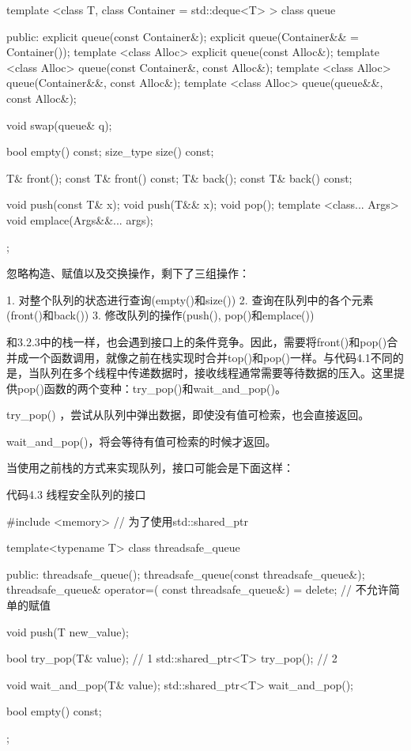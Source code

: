 \begin{cpp}
template <class T, class Container = std::deque<T> >
class queue {
public:
  explicit queue(const Container&);
  explicit queue(Container&& = Container());
  template <class Alloc> explicit queue(const Alloc&);
  template <class Alloc> queue(const Container&, const Alloc&);
  template <class Alloc> queue(Container&&, const Alloc&);
  template <class Alloc> queue(queue&&, const Alloc&);

  void swap(queue& q);

  bool empty() const;
  size_type size() const;

  T& front();
  const T& front() const;
  T& back();
  const T& back() const;

  void push(const T& x);
  void push(T&& x);
  void pop();
  template <class... Args> void emplace(Args&&... args);
};
\end{cpp}

忽略构造、赋值以及交换操作，剩下了三组操作：

1. 对整个队列的状态进行查询(empty()和size())
2. 查询在队列中的各个元素(front()和back())
3. 修改队列的操作(push(), pop()和emplace())

和3.2.3中的栈一样，也会遇到接口上的条件竞争。因此，需要将front()和pop()合并成一个函数调用，就像之前在栈实现时合并top()和pop()一样。与代码4.1不同的是，当队列在多个线程中传递数据时，接收线程通常需要等待数据的压入。这里提供pop()函数的两个变种：try\_pop()和wait\_and\_pop()。

try\_pop() ，尝试从队列中弹出数据，即使没有值可检索，也会直接返回。

wait\_and\_pop()，将会等待有值可检索的时候才返回。

当使用之前栈的方式来实现队列，接口可能会是下面这样：

代码4.3 线程安全队列的接口

\begin{cpp}
#include <memory> // 为了使用std::shared_ptr

template<typename T>
class threadsafe_queue
{
public:
  threadsafe_queue();
  threadsafe_queue(const threadsafe_queue&);
  threadsafe_queue& operator=(
      const threadsafe_queue&) = delete;  // 不允许简单的赋值

  void push(T new_value);

  bool try_pop(T& value);  // 1
  std::shared_ptr<T> try_pop();  // 2

  void wait_and_pop(T& value);
  std::shared_ptr<T> wait_and_pop();

  bool empty() const;
};
\end{cpp}

